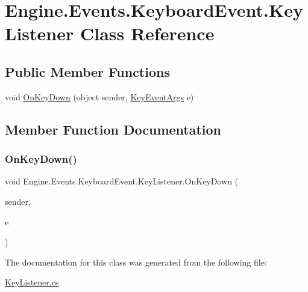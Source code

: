 \hypertarget{a00370}{}\section{Engine.\+Events.\+Keyboard\+Event.\+Key\+Listener Class Reference}
\label{a00370}
\subsection*{Public Member Functions}
\begin{DoxyCompactItemize}
\item 
void \hyperlink{a00370_a3de90f1e3196711132154718c47201ff}{On\+Key\+Down} (object sender, \hyperlink{a00362}{Key\+Event\+Args} e)
\end{DoxyCompactItemize}


\subsection{Member Function Documentation}
\mbox{\label{a00370_a3de90f1e3196711132154718c47201ff}} 
\subsubsection{\texorpdfstring{On\+Key\+Down()}{OnKeyDown()}}
{\footnotesize\ttfamily void Engine.\+Events.\+Keyboard\+Event.\+Key\+Listener.\+On\+Key\+Down (\begin{DoxyParamCaption}\item[{object}]{sender,  }\item[{\hyperlink{a00362}{Key\+Event\+Args}}]{e }\end{DoxyParamCaption})\hspace{0.3cm}{\ttfamily [inline]}}



The documentation for this class was generated from the following file\+:\begin{DoxyCompactItemize}
\item 
\hyperlink{a00059}{Key\+Listener.\+cs}\end{DoxyCompactItemize}
